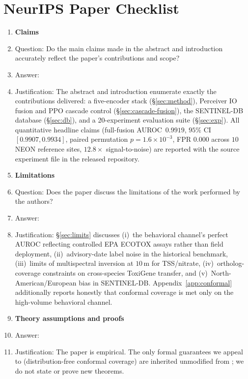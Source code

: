\section*{NeurIPS Paper Checklist}

\begin{enumerate}

\item {\bf Claims}
    \item[] Question: Do the main claims made in the abstract and introduction accurately reflect the paper's contributions and scope?
    \item[] Answer: \answerYes{}
    \item[] Justification: The abstract and introduction enumerate exactly the contributions delivered: a five-encoder stack (\S\ref{sec:method}), Perceiver IO fusion and PPO cascade control (\S\ref{sec:cascade-fusion}), the SENTINEL-DB database (\S\ref{sec:db}), and a 20-experiment evaluation suite (\S\ref{sec:exp}). All quantitative headline claims (full-fusion AUROC~$0.9919$, $95\%$ CI $[0.9907,0.9934]$, paired permutation $p\!=\!1.6{\times}10^{-3}$, FPR $0.000$ across $10$ NEON reference sites, $12.8\times$ signal-to-noise) are reported with the source experiment file in the released repository.

\item {\bf Limitations}
    \item[] Question: Does the paper discuss the limitations of the work performed by the authors?
    \item[] Answer: \answerYes{}
    \item[] Justification: \S\ref{sec:limits} discusses (i)~the behavioral channel's perfect AUROC reflecting controlled EPA ECOTOX assays rather than field deployment, (ii)~advisory-date label noise in the historical benchmark, (iii)~limits of multispectral inversion at $10$\,m for TSS/nitrate, (iv)~ortholog-coverage constraints on cross-species ToxiGene transfer, and (v)~North-American/European bias in SENTINEL-DB. Appendix~\ref{app:conformal} additionally reports honestly that conformal coverage is met only on the high-volume behavioral channel.

\item {\bf Theory assumptions and proofs}
    \item[] Answer: \answerNA{}
    \item[] Justification: The paper is empirical. The only formal guarantees we appeal to (distribution-free conformal coverage) are inherited unmodified from \citep{vovk2005conformal,angelopoulos2021conformal}; we do not state or prove new theorems.


\end{enumerate}
